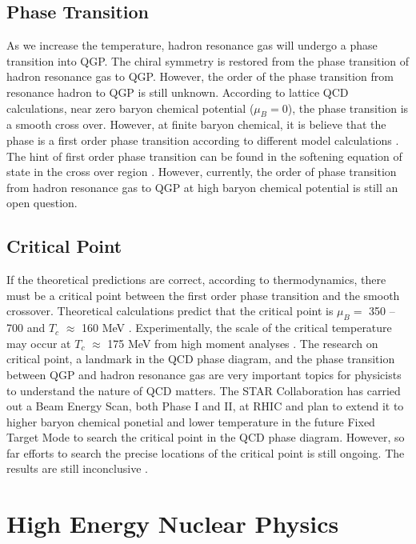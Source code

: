 \subsection{Phase Transition}

As we increase the temperature, hadron resonance gas will undergo a phase transition into QGP. The chiral symmetry is restored from the phase transition of hadron resonance gas to QGP. However, the order of the phase transition from resonance hadron to QGP is still unknown. According to lattice QCD calculations, near zero baryon chemical potential ($\mu_B = 0$), the phase transition is a smooth cross over. However, at finite baryon chemical, it is believe that the phase is a first order phase transition according to different model calculations \cite{QCDFirstOrder}. The hint of first order phase transition can be found in the softening equation of state in the cross over region \cite{EOSPhase}. However, currently, the order of phase transition from hadron resonance gas to QGP at high baryon chemical potential is still an open question. %

\subsection{Critical Point}

If the theoretical predictions are correct, according to thermodynamics, there must be a critical point between the first order phase transition and the smooth crossover. Theoretical calculations predict that the critical point is $\mu_B = $ 350 -- 700 and $T_{c}$ $\approx$ 160 MeV \cite{CriticalPointTH}. Experimentally, the scale of the critical temperature may occur at $T_{c}$ $\approx$ 175 MeV from high moment analyses \cite{CriticalPointEX}. The research on critical point, a landmark in the QCD phase diagram, and the phase transition between QGP and hadron resonance gas are very important topics for physicists to understand the nature of QCD matters. The STAR Collaboration has carried out a Beam Energy Scan, both Phase I and II, at RHIC and plan to extend it to higher baryon chemical ponetial and lower temperature in the future Fixed Target Mode to search the critical point in the QCD phase diagram. However, so far efforts to search the precise locations of the critical point is still ongoing. The results are still inconclusive \cite{STARBES}. 

\section{High Energy Nuclear Physics}

